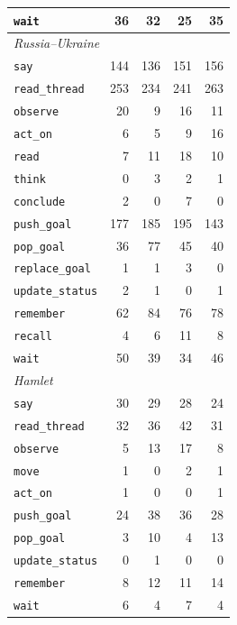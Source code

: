\begin{tabular}{lrrrr}
\quad\texttt{wait} & 36 & 32 & 25 & 35 \\
\midrule
\multicolumn{5}{l}{\emph{Russia--Ukraine}} \\
\quad\texttt{say} & 144 & 136 & 151 & 156 \\
\quad\texttt{read\_thread} & 253 & 234 & 241 & 263 \\
\quad\texttt{observe} & 20 & 9 & 16 & 11 \\
\quad\texttt{act\_on} & 6 & 5 & 9 & 16 \\
\quad\texttt{read} & 7 & 11 & 18 & 10 \\
\quad\texttt{think} & 0 & 3 & 2 & 1 \\
\quad\texttt{conclude} & 2 & 0 & 7 & 0 \\
\quad\texttt{push\_goal} & 177 & 185 & 195 & 143 \\
\quad\texttt{pop\_goal} & 36 & 77 & 45 & 40 \\
\quad\texttt{replace\_goal} & 1 & 1 & 3 & 0 \\
\quad\texttt{update\_status} & 2 & 1 & 0 & 1 \\
\quad\texttt{remember} & 62 & 84 & 76 & 78 \\
\quad\texttt{recall} & 4 & 6 & 11 & 8 \\
\quad\texttt{wait} & 50 & 39 & 34 & 46 \\
\midrule
\multicolumn{5}{l}{\emph{Hamlet}} \\
\quad\texttt{say} & 30 & 29 & 28 & 24 \\
\quad\texttt{read\_thread} & 32 & 36 & 42 & 31 \\
\quad\texttt{observe} & 5 & 13 & 17 & 8 \\
\quad\texttt{move} & 1 & 0 & 2 & 1 \\
\quad\texttt{act\_on} & 1 & 0 & 0 & 1 \\
\quad\texttt{push\_goal} & 24 & 38 & 36 & 28 \\
\quad\texttt{pop\_goal} & 3 & 10 & 4 & 13 \\
\quad\texttt{update\_status} & 0 & 1 & 0 & 0 \\
\quad\texttt{remember} & 8 & 12 & 11 & 14 \\
\quad\texttt{wait} & 6 & 4 & 7 & 4 \\
\bottomrule
\end{tabular}
